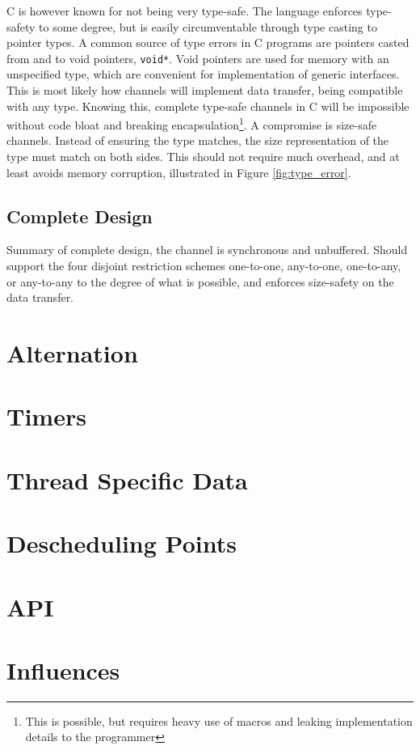 C is however known for not being very type\hyp{}safe. The language enforces type\hyp{}safety to some degree, but is easily circumventable through type casting to pointer types. A common source of type errors in C programs are pointers casted from and to void pointers, \texttt{void*}. Void pointers are used for memory with an unspecified type, which are convenient for implementation of generic interfaces. This is most likely how channels will implement data transfer, being compatible with any type. Knowing this, complete type\hyp{}safe channels in C will be impossible without code bloat and breaking encapsulation\footnote{This is possible, but requires heavy use of macros and leaking implementation details to the programmer}. A compromise is size\hyp{}safe channels. Instead of ensuring the type matches, the size representation of the type must match on both sides. This should not require much overhead, and at least avoids memory corruption, illustrated in Figure \ref{fig:type_error}.

\subsection{Complete Design}

Summary of complete design, the channel is synchronous and unbuffered. Should support the four disjoint restriction schemes one\hyp{}to\hyp{}one, any\hyp{}to\hyp{}one, one\hyp{}to\hyp{}any, or any\hyp{}to\hyp{}any to the degree of what is possible, and enforces size\hyp{}safety on the data transfer.


\section{Alternation}




\section{Timers}



\section{Thread Specific Data}
\label{sec:thread_specific_data}




\section{Descheduling Points}




\section{API}




\section{Influences}



